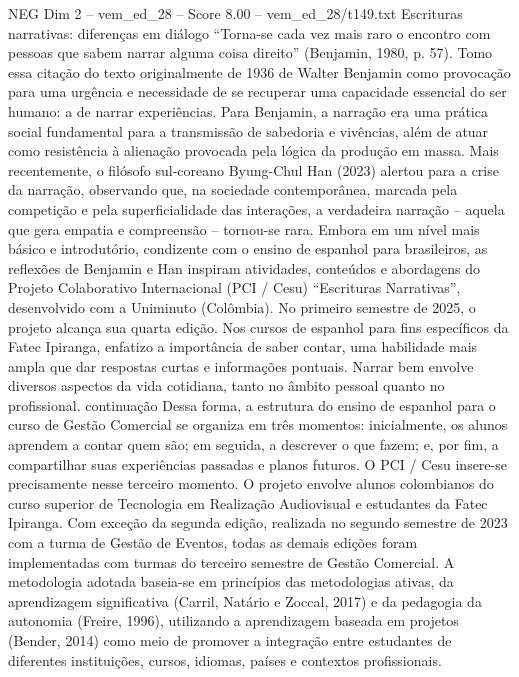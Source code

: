 \begin{textsample}{NEG Dim 2 – vem\_ed\_28 – Score 8.00 – vem\_ed\_28/t149.txt}  \label{ex:f2_neg_118}
Escrituras narrativas: diferenças em diálogo “Torna-se cada vez mais raro o encontro com pessoas que sabem narrar alguma coisa direito” (Benjamin, 1980, p. 57).
Tomo essa citação do texto originalmente de 1936 de Walter Benjamin como provocação para uma urgência e necessidade de se recuperar uma capacidade essencial do ser humano: a de narrar experiências.
Para Benjamin, a narração era uma prática social fundamental para a transmissão de sabedoria e vivências, além de atuar como resistência à alienação provocada pela lógica da produção em massa.
Mais recentemente, o filósofo sul-coreano Byung-Chul Han (2023) alertou para a crise da narração, observando que, na sociedade contemporânea, marcada pela competição e pela superficialidade das interações, a verdadeira narração – aquela que gera empatia e compreensão – tornou-se rara.
Embora em um nível mais básico e introdutório, condizente com o ensino de espanhol para brasileiros, as reflexões de Benjamin e Han inspiram atividades, conteúdos e abordagens do Projeto Colaborativo Internacional (PCI / Cesu) “Escrituras Narrativas”, desenvolvido com a Uniminuto (Colômbia).
No primeiro semestre de 2025, o projeto alcança sua quarta edição.
Nos cursos de espanhol para fins específicos da Fatec Ipiranga, enfatizo a importância de saber contar, uma habilidade mais ampla que dar respostas curtas e informações pontuais.
Narrar bem envolve diversos aspectos da vida cotidiana, tanto no âmbito pessoal quanto no profissional. continuação Dessa forma, a estrutura do ensino de espanhol para o curso de Gestão Comercial se organiza em três momentos: inicialmente, os alunos aprendem a contar quem são; em seguida, a descrever o que fazem; e, por fim, a compartilhar suas experiências passadas e planos futuros.
O PCI / Cesu insere-se precisamente nesse terceiro momento.
O projeto envolve alunos colombianos do curso superior de Tecnologia em Realização Audiovisual e estudantes da Fatec Ipiranga.
Com exceção da segunda edição, realizada no segundo semestre de 2023 com a turma de Gestão de Eventos, todas as demais edições foram implementadas com turmas do terceiro semestre de Gestão Comercial.
A metodologia adotada baseia-se em princípios das metodologias ativas, da aprendizagem significativa (Carril, Natário e Zoccal, 2017) e da pedagogia da autonomia (Freire, 1996), utilizando a aprendizagem baseada em projetos (Bender, 2014) como meio de promover a integração entre estudantes de diferentes instituições, cursos, idiomas, países e contextos profissionais.

\end{textsample}
